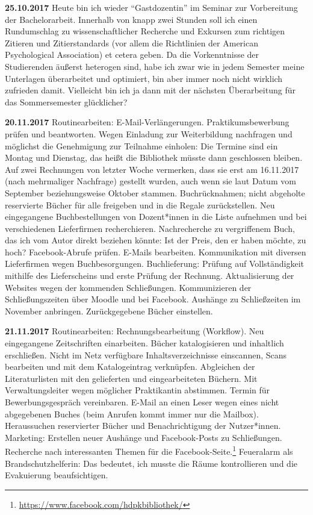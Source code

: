 \documentclass[a4paper,
fontsize=11pt,
oneside,
numbers=noperiodatend,
parskip=half-,
bibliography=totoc,
final
]{scrartcl}
\begin{document}
\textbf{25.10.2017} Heute bin ich wieder \enquote{Gastdozentin} im
Seminar zur Vorbereitung der Bachelorarbeit. Innerhalb von knapp zwei
Stunden soll ich einen Rundumschlag zu wissenschaftlicher Recherche und
Exkursen zum richtigen Zitieren und Zitierstandards (vor allem die
Richtlinien der American Psychological Association) et cetera geben. Da
die Vorkenntnisse der Studierenden äußerst heterogen sind, habe ich zwar
wie in jedem Semester meine Unterlagen überarbeitet und optimiert, bin
aber immer noch nicht wirklich zufrieden damit. Vielleicht bin ich ja
dann mit der nächsten Überarbeitung für das Sommersemester glücklicher?

\textbf{20.11.2017} Routinearbeiten: E-Mail-Verlängerungen.
Praktikumsbewerbung prüfen und beantworten. Wegen Einladung zur
Weiterbildung nachfragen und möglichst die Genehmigung zur Teilnahme
einholen: Die Termine sind ein Montag und Dienstag, das heißt die
Bibliothek müsste dann geschlossen bleiben. Auf zwei Rechnungen von
letzter Woche vermerken, dass sie erst am 16.11.2017 (nach mehrmaliger
Nachfrage) gestellt wurden, auch wenn sie laut Datum vom September
beziehungsweise Oktober stammen. Buchrücknahmen; nicht abgeholte
reservierte Bücher für alle freigeben und in die Regale zurückstellen.
Neu eingegangene Buchbestellungen von Dozent*innen in die Liste
aufnehmen und bei verschiedenen Lieferfirmen recherchieren.
Nachrecherche zu vergriffenem Buch, das ich vom Autor direkt beziehen
könnte: Ist der Preis, den er haben möchte, zu hoch? Facebook-Abrufe
prüfen. E-Mails bearbeiten. Kommunikation mit diversen Lieferfirmen
wegen Buchbesorgungen. Buchlieferung: Prüfung auf Vollständigkeit
mithilfe des Lieferscheins und erste Prüfung der Rechnung.
Aktualisierung der Websites wegen der kommenden Schließungen.
Kommunizieren der Schließungszeiten über Moodle und bei Facebook.
Aushänge zu Schließzeiten im November anbringen. Zurückgegebene Bücher
einstellen.

\textbf{21.11.2017} Routinearbeiten: Rechnungsbearbeitung (Workflow).
Neu eingegangene Zeitschriften einarbeiten. Bücher katalogisieren und
inhaltlich erschließen. Nicht im Netz verfügbare Inhaltsverzeichnisse
einscannen, Scans bearbeiten und mit dem Katalogeintrag verknüpfen.
Abgleichen der Literaturlisten mit den gelieferten und eingearbeiteten
Büchern. Mit Verwaltungsleiter wegen möglicher Praktikantin abstimmen.
Termin für Bewerbungsgespräch vereinbaren. E-Mail an einen Leser wegen
eines nicht abgegebenen Buches (beim Anrufen kommt immer nur die
Mailbox). Heraussuchen reservierter Bücher und Benachrichtigung der
Nutzer*innen. Marketing: Erstellen neuer Aushänge und Facebook-Posts zu
Schließungen. Recherche nach interessanten Themen für die
Facebook-Seite.\footnote{\url{https://www.facebook.com/hdpkbibliothek/}}
Feueralarm als Brandschutzhelferin: Das bedeutet, ich musste die Räume
kontrollieren und die Evakuierung beaufsichtigen.
\end{document}

